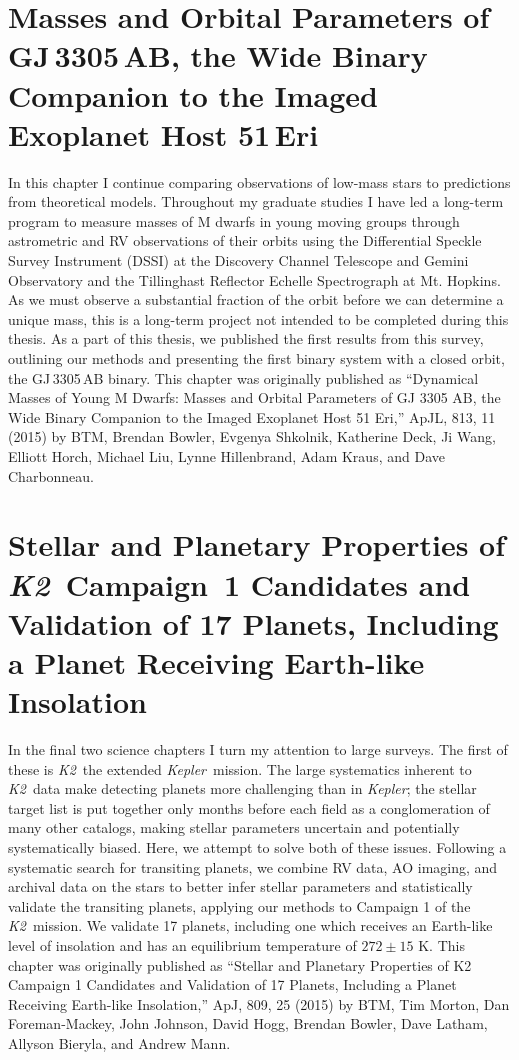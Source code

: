 \documentclass[12pt]{caltech_thesis}
\newcommand{\kep}{{\textit {Kepler}}}
\newcommand{\KT}{{\textit {K2}}}
\begin{document}


\chapter{Masses and Orbital Parameters of GJ\,3305\,AB, the Wide Binary Companion to the Imaged Exoplanet Host 51\,Eri}
\label{chap:Mbinaries}

In this chapter I continue comparing observations of low-mass stars to predictions from theoretical models.
Throughout my graduate studies I have led a long-term program to measure masses of M dwarfs in young moving groups
through astrometric and RV observations of their orbits using the Differential Speckle Survey Instrument (DSSI) at the 
Discovery Channel Telescope and Gemini Observatory and the Tillinghast Reflector Echelle Spectrograph at 
Mt. Hopkins.
As we must observe a substantial fraction of the orbit before we can determine a unique mass, this is a long-term project
not intended to be completed during this thesis.
As a part of this thesis, we published the first results from this survey, outlining our methods and presenting the first binary
system with a closed orbit, the GJ\,3305\,AB binary.
This chapter was originally published as ``Dynamical Masses of Young M Dwarfs: Masses and Orbital Parameters of GJ 3305 AB, the Wide Binary Companion to the Imaged Exoplanet Host 51 Eri,'' ApJL, 813, 11 (2015) by BTM, Brendan Bowler, 
Evgenya Shkolnik, Katherine Deck, Ji Wang, Elliott Horch, Michael Liu, Lynne Hillenbrand, Adam Kraus, and Dave 
Charbonneau.



\chapter{Stellar and Planetary Properties of \KT\ Campaign~1 Candidates and Validation of 17 Planets, Including a Planet Receiving Earth-like Insolation}
\label{chap:k2}
In the final two science chapters I turn my attention to large surveys. The first of these is \KT\ the extended \kep\ mission.
The large systematics inherent to \KT\ data make detecting planets more challenging than in \kep; the stellar target list is
put together only months before each field as a conglomeration of many other catalogs, making stellar parameters uncertain
and potentially systematically biased.
Here, we attempt to solve both of these issues.
Following a systematic search for transiting planets, we combine RV data, AO imaging, and archival data on the stars to
better infer stellar parameters and statistically validate the transiting planets, applying our methods to Campaign 1 of the
\KT\ mission.
We validate 17 planets, including one which receives an Earth-like level of insolation and has an equilibrium temperature of $272 \pm 15$ K.
This chapter was originally published as ``Stellar and Planetary Properties of K2 Campaign 1 Candidates and Validation of 17 Planets, Including a Planet Receiving Earth-like Insolation,'' ApJ, 809, 25 (2015) by BTM, Tim Morton, Dan Foreman-Mackey,
John Johnson, David Hogg, Brendan Bowler, Dave Latham, Allyson Bieryla, and Andrew Mann.
\end{document}
